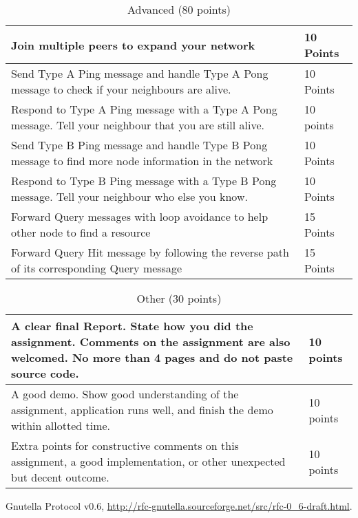 \documentclass[12pt, a4paper]{article}
\begin{document}
\begin{table}[htdp]
\caption{Advanced (80 points)}
\begin{center}
\begin{tabular}{|p{12cm}|p{2cm}|}
\hline
Join multiple peers to expand your network & 10 Points \\
\hline
Send Type A Ping message and handle Type A Pong message to check if your neighbours are alive. & 10 Points \\
\hline
Respond to Type A Ping message with a Type A Pong message.
Tell your neighbour that you are still alive. & 10 points \\
\hline
Send Type B Ping message and handle Type B Pong message to find more node information in the network & 10 Points \\
\hline
Respond to Type B Ping message with a Type B Pong message.
Tell your neighbour who else you know. & 10 Points \\
\hline
Forward Query messages with loop avoidance to help other node to find a resource & 15 Points \\
\hline
Forward Query Hit message by following the reverse path of its corresponding Query message & 15 Points \\
\hline
\end{tabular}
\end{center}
\end{table}

\begin{table}[htdp]
\caption{Other (30 points)}
\begin{center}
\begin{tabular}{|p{12cm}|p{2cm}|}
\hline
A clear final Report.
State how you did the assignment.
Comments on the assignment are also welcomed.
No more than 4 pages and do not paste source code. & 10 points \\
\hline
A good demo.
Show good understanding of the assignment, application runs well, and finish the demo within allotted time. & 10 points \\
\hline
Extra points for constructive comments on this assignment, a good implementation, or other unexpected but decent outcome. & 10 points \\

\hline
\end{tabular}
\end{center}
\end{table}


\FloatBarrier

\begin{thebibliography}{1}

Gnutella Protocol v0.6, \url{http://rfc-gnutella.sourceforge.net/src/rfc-0\_6-draft.html}.

\end{thebibliography}
\end{document}
